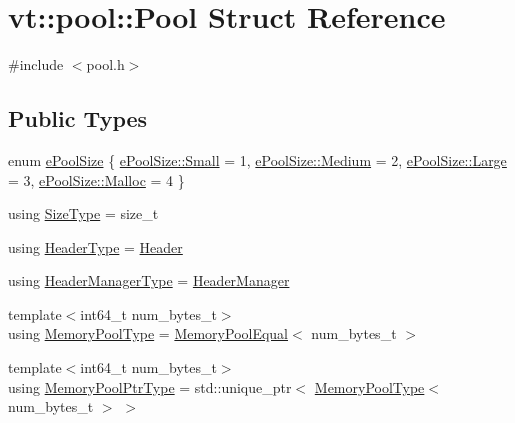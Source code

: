 \hypertarget{structvt_1_1pool_1_1_pool}{}\section{vt\+:\+:pool\+:\+:Pool Struct Reference}
\label{structvt_1_1pool_1_1_pool}


{\ttfamily \#include $<$pool.\+h$>$}

\subsection*{Public Types}
\begin{DoxyCompactItemize}
\item 
enum \hyperlink{structvt_1_1pool_1_1_pool_ace8d36439e5e599a8ee68b2f1a6a6b28}{e\+Pool\+Size} \{ \hyperlink{structvt_1_1pool_1_1_pool_ace8d36439e5e599a8ee68b2f1a6a6b28a2660064e68655415da2628c2ae2f7592}{e\+Pool\+Size\+::\+Small} = 1, 
\hyperlink{structvt_1_1pool_1_1_pool_ace8d36439e5e599a8ee68b2f1a6a6b28a87f8a6ab85c9ced3702b4ea641ad4bb5}{e\+Pool\+Size\+::\+Medium} = 2, 
\hyperlink{structvt_1_1pool_1_1_pool_ace8d36439e5e599a8ee68b2f1a6a6b28a3a69b34ce86dacb205936a8094f6c743}{e\+Pool\+Size\+::\+Large} = 3, 
\hyperlink{structvt_1_1pool_1_1_pool_ace8d36439e5e599a8ee68b2f1a6a6b28a1131a914388fac73e5f07b0ba0aad523}{e\+Pool\+Size\+::\+Malloc} = 4
 \}
\item 
using \hyperlink{structvt_1_1pool_1_1_pool_a4030898e09d0160c24743a7b949c0d46}{Size\+Type} = size\+\_\+t
\item 
using \hyperlink{structvt_1_1pool_1_1_pool_a887de970f8d8fbec63df120348c31404}{Header\+Type} = \hyperlink{structvt_1_1pool_1_1_header}{Header}
\item 
using \hyperlink{structvt_1_1pool_1_1_pool_acc5ad2d64bf6ff58fead958a69c12d74}{Header\+Manager\+Type} = \hyperlink{structvt_1_1pool_1_1_header_manager}{Header\+Manager}
\item 
{\footnotesize template$<$int64\+\_\+t num\+\_\+bytes\+\_\+t$>$ }\\using \hyperlink{structvt_1_1pool_1_1_pool_a06673914350d933ad5205155eca14a3b}{Memory\+Pool\+Type} = \hyperlink{structvt_1_1pool_1_1_memory_pool_equal}{Memory\+Pool\+Equal}$<$ num\+\_\+bytes\+\_\+t $>$
\item 
{\footnotesize template$<$int64\+\_\+t num\+\_\+bytes\+\_\+t$>$ }\\using \hyperlink{structvt_1_1pool_1_1_pool_a21e20f5b56c3bae4f0d0cc36ed9c5eee}{Memory\+Pool\+Ptr\+Type} = std\+::unique\+\_\+ptr$<$ \hyperlink{structvt_1_1pool_1_1_pool_a06673914350d933ad5205155eca14a3b}{Memory\+Pool\+Type}$<$ num\+\_\+bytes\+\_\+t $>$ $>$
\end{DoxyCompactItemize}
